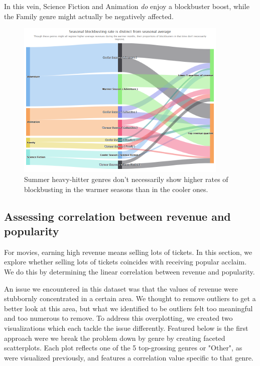 \documentclass[12pt]{article}
\begin{document}
In this vein, Science Fiction and Animation \textit{do} enjoy a blockbuster boost, while the Family genre might actually be negatively affected.
\begin{figure}[H]
    \centering
    \includegraphics[width=0.9\textwidth]{images/final_drafts/summer_blockbuster_sankey.png}
    \caption{Summer heavy-hitter genres don't necessarily show higher rates of blockbusting in the warmer seasons than in the cooler ones.}
    \label{fig:figure_5}
\end{figure}

\subsection{Assessing correlation between revenue and popularity}

For movies, earning high revenue means selling lots of tickets. In this section, we explore whether selling lots of tickets coincides with receiving popular acclaim. We do this by determining the linear correlation between revenue and popularity.

An issue we encountered in this dataset was that the values of revenue were stubbornly concentrated in a certain area. We thought to remove outliers to get a better look at this area, but what we identified to be outliers felt too meaningful and too numerous to remove. To address this overplotting, we created two visualizations which each tackle the issue differently. Featured below is the first approach were we break the problem down by genre by creating faceted scatterplots. Each plot reflects one of the 5 top-grossing genres or "Other", as were visualized previously, and features a correlation value specific to that genre.
\end{document}

